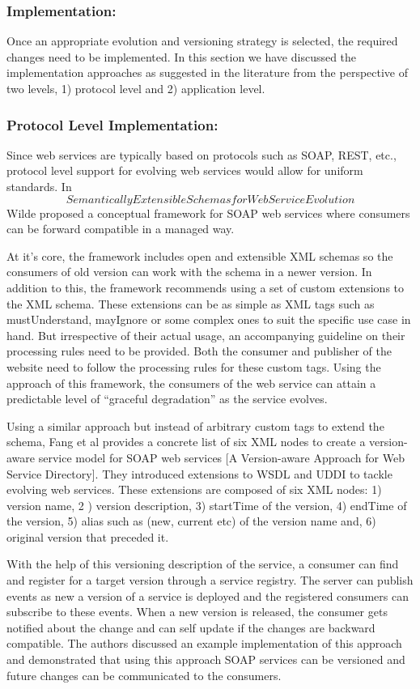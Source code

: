 \documentclass[runningheads,a4paper]{llncs}
\begin{document}
\subsubsection{Implementation:}
Once an appropriate evolution and versioning strategy is selected, the required changes need to be implemented. In this section we have discussed the implementation approaches as suggested in the literature from the perspective of two levels, 1) protocol level and 2) application level.

\subsubsection{Protocol Level Implementation:}
Since web services are typically based on protocols such as SOAP, REST, etc., protocol level support for evolving web services would allow for uniform standards. In \[Semantically Extensible Schemas for Web Service Evolution\] Wilde proposed a conceptual framework for SOAP web services where consumers can be forward compatible in a managed way.

At it’s core, the framework includes open and extensible XML schemas so the consumers of old version can work with the schema in a newer version. In addition to this, the framework recommends using a set of custom extensions to the XML schema. These extensions can be as simple as XML tags such as mustUnderstand, mayIgnore or some complex ones to suit the specific use case in hand. But irrespective of their actual usage, an accompanying guideline on their processing rules need to be provided. Both the consumer and publisher of the website need to follow the processing rules for these custom tags. Using the approach of this framework, the consumers of the web service can attain a predictable level of ``graceful degradation'' as the service evolves.

Using a similar approach but instead of arbitrary custom tags to extend the schema, Fang et al provides a concrete list of six XML nodes to create a version-aware service model for SOAP web services [A Version-aware Approach for Web Service Directory]. They introduced extensions to WSDL and UDDI to tackle evolving web services. These extensions are composed of six XML nodes: 1) version name, 2 ) version description, 3) startTime of the version, 4) endTime of the version, 5) alias such as (new, current etc) of the version name and, 6) original version that preceded it.

With the help of this versioning description of the service, a consumer can find and register for a target version through a service registry. The server can publish events as new a version of a service is deployed and the registered consumers can subscribe to these events. When a new version is released, the consumer gets notified about the change and can self update if the changes are backward compatible. The authors discussed an example implementation of this approach and demonstrated that using this approach SOAP services can be versioned and future changes can be communicated to the consumers.
\end{document}
